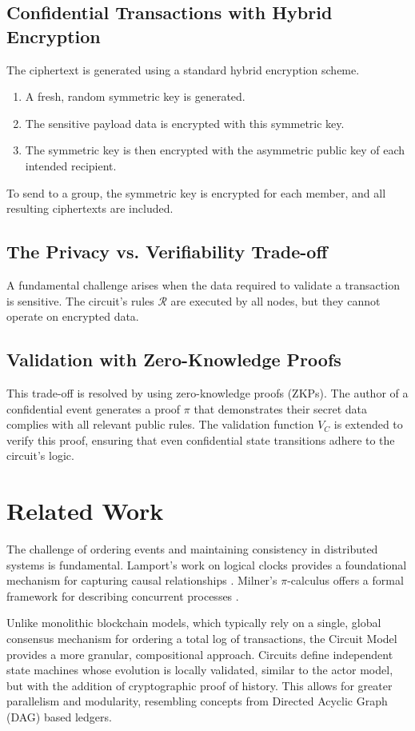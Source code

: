 \documentclass{article}
\begin{document}
\subsection{Confidential Transactions with Hybrid Encryption}
The ciphertext is generated using a standard hybrid encryption scheme.
\begin{enumerate}
    \item A fresh, random symmetric key is generated.
    \item The sensitive payload data is encrypted with this symmetric key.
    \item The symmetric key is then encrypted with the asymmetric public key of each intended recipient.
\end{enumerate}
To send to a group, the symmetric key is encrypted for each member, and all resulting ciphertexts are included.

\subsection{The Privacy vs. Verifiability Trade-off}
A fundamental challenge arises when the data required to validate a transaction is sensitive. The circuit's rules $\mathcal{R}$ are executed by all nodes, but they cannot operate on encrypted data. 

\subsection{Validation with Zero-Knowledge Proofs}
This trade-off is resolved by using zero-knowledge proofs (ZKPs). The author of a confidential event generates a proof $\pi$ that demonstrates their secret data complies with all relevant public rules. The validation function $V_C$ is extended to verify this proof, ensuring that even confidential state transitions adhere to the circuit's logic.

\section{Related Work}

The challenge of ordering events and maintaining consistency in distributed systems is fundamental. Lamport's work on logical clocks provides a foundational mechanism for capturing causal relationships \cite{lamport1978}. Milner's $\pi$-calculus offers a formal framework for describing concurrent processes \cite{milner1999}. 

Unlike monolithic blockchain models, which typically rely on a single, global consensus mechanism for ordering a total log of transactions, the Circuit Model provides a more granular, compositional approach. Circuits define independent state machines whose evolution is locally validated, similar to the actor model, but with the addition of cryptographic proof of history. This allows for greater parallelism and modularity, resembling concepts from Directed Acyclic Graph (DAG) based ledgers.
\end{document}
